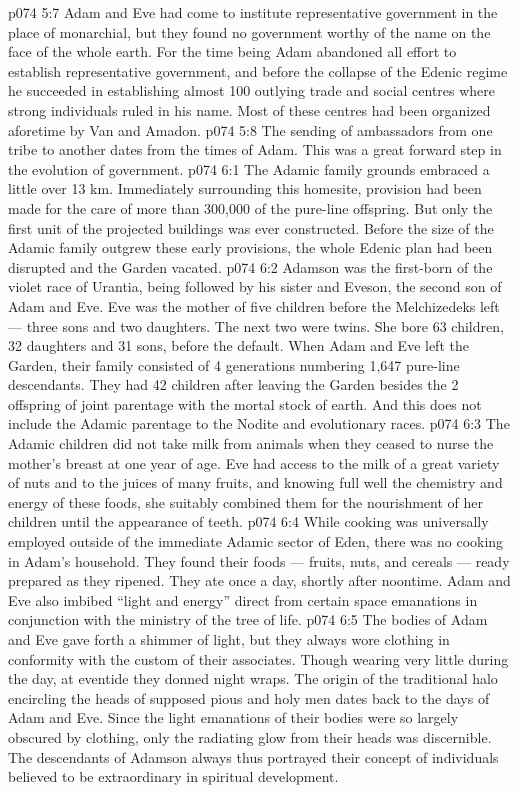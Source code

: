 \vs p074 5:7 Adam and Eve had come to institute representative government in the place of monarchial, but they found no government worthy of the name on the face of the whole earth. For the time being Adam abandoned all effort to establish representative government, and before the collapse of the Edenic regime he succeeded in establishing almost 100 outlying trade and social centres where strong individuals ruled in his name. Most of these centres had been organized aforetime by Van and Amadon.
\vs p074 5:8 The sending of ambassadors from one tribe to another dates from the times of Adam. This was a great forward step in the evolution of government.
\vs p074 6:1 The Adamic family grounds embraced a little over 13 km. Immediately surrounding this homesite, provision had been made for the care of more than 300,000 of the pure\hyp{}line offspring. But only the first unit of the projected buildings was ever constructed. Before the size of the Adamic family outgrew these early provisions, the whole Edenic plan had been disrupted and the Garden vacated.
\vs p074 6:2 \pc Adamson was the first\hyp{}born of the violet race of Urantia, being followed by his sister and Eveson, the second son of Adam and Eve. Eve was the mother of five children before the Melchizedeks left --- three sons and two daughters. The next two were twins. She bore 63 children, 32 daughters and 31 sons, before the default. When Adam and Eve left the Garden, their family consisted of 4 generations numbering 1,647 pure\hyp{}line descendants. They had 42 children after leaving the Garden besides the 2 offspring of joint parentage with the mortal stock of earth. And this does not include the Adamic parentage to the Nodite and evolutionary races.
\vs p074 6:3 The Adamic children did not take milk from animals when they ceased to nurse the mother’s breast at one year of age. Eve had access to the milk of a great variety of nuts and to the juices of many fruits, and knowing full well the chemistry and energy of these foods, she suitably combined them for the nourishment of her children until the appearance of teeth.
\vs p074 6:4 While cooking was universally employed outside of the immediate Adamic sector of Eden, there was no cooking in Adam’s household. They found their foods --- fruits, nuts, and cereals --- ready prepared as they ripened. They ate once a day, shortly after noontime. Adam and Eve also imbibed “light and energy” direct from certain space emanations in conjunction with the ministry of the tree of life.
\vs p074 6:5 \pc The bodies of Adam and Eve gave forth a shimmer of light, but they always wore clothing in conformity with the custom of their associates. Though wearing very little during the day, at eventide they donned night wraps. The origin of the traditional halo encircling the heads of supposed pious and holy men dates back to the days of Adam and Eve. Since the light emanations of their bodies were so largely obscured by clothing, only the radiating glow from their heads was discernible. The descendants of Adamson always thus portrayed their concept of individuals believed to be extraordinary in spiritual development.
